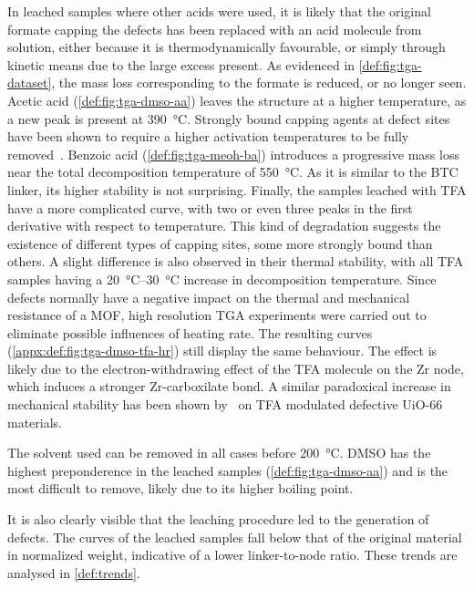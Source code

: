 In leached samples where other acids were used,
it is likely that the original formate capping the defects 
has been replaced with an acid molecule from solution,
either because it is thermodynamically favourable, or simply through 
kinetic means due to the large excess present.
As evidenced in \autoref{def:fig:tga-dataset}, the mass 
loss corresponding to the formate is reduced, or no longer seen. 
Acetic acid (\autoref{def:fig:tga-dmso-aa}) leaves the 
structure at a higher temperature, as
a new peak is present at \SI{390}{\degreeCelsius}. Strongly
bound capping agents at defect sites have been shown to 
require a higher activation temperatures to be fully
removed~\cite{jiaoHeatTreatmentDefectiveUiO662017}.
Benzoic acid (\autoref{def:fig:tga-meoh-ba}) introduces a progressive 
mass loss near the total decomposition temperature 
of \SI{550}{\degreeCelsius}.
As it is similar to the BTC linker, its higher stability
is not surprising. Finally, the samples leached with 
TFA have a more complicated curve, with two or even 
three peaks in the first derivative with respect to temperature.
This kind of degradation suggests the existence of different types
of capping sites, some more strongly bound than others.
A slight difference is also observed in their thermal stability,
with all TFA samples having a \SIrange{20}{30}{\degreeCelsius}
increase in decomposition temperature. Since defects normally
have a negative impact on the thermal and mechanical resistance 
of a MOF, high resolution TGA experiments were carried out
to eliminate possible influences of heating rate. The resulting
curves (\autoref{appx:def:fig:tga-dmso-tfa-hr}) still display 
the same behaviour. The effect is likely due to the
electron-withdrawing effect of the TFA molecule on the Zr 
node, which induces a stronger Zr-carboxilate bond. A similar
paradoxical increase in mechanical stability has been shown 
by~\citet{vandevoordeImprovingMechanicalStability2015} on 
TFA modulated defective UiO-66 materials.

The solvent used can be removed in all cases before 
\SI{200}{\degreeCelsius}. DMSO has the highest
preponderence in the leached samples (\autoref{def:fig:tga-dmso-aa}) 
and is the most difficult to remove, likely due to its higher boiling point.

It is also clearly visible that the leaching procedure
led to the generation of defects. The curves 
of the leached samples fall below that of the original material
in normalized weight, indicative of a lower linker-to-node ratio.
These trends are analysed in \autoref{def:trends}.
